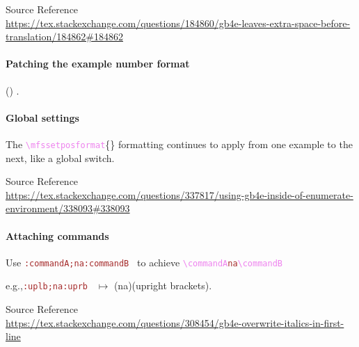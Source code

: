 \documentclass{article}
\newcommand\surl[1]{{\footnotesize\noindent Source Reference}\\\url{#1}}
\newcommand\uplb{\textup{(}}
\newcommand\uprb{\textup{)}}
\newcommand\para[1]{\bigskip\bigskip\paragraph{#1}}
\newcommand\glcmd[1]{\textcolor{violet}{\texttt{\textbackslash#1}}}
\newcommand\glcmdb[1]{\glcmd{#1}\{\}}
\newcommand\glmeta[1]{\textcolor{brown}{\texttt{#1}}}
\newcommand\eg{e.g.,\space}
\begin{document}
\surl{https://tex.stackexchange.com/questions/184860/gb4e-leaves-extra-space-before-translation/184862#184862}


\para{Patching the example number format}

{
\makeatletter
\patchcmd\@exe
  {(\thexnumi)}
  {\thexnumi.}
  {}{}
\makeatother
\begin{exe}
    \ex
\end{exe}
}



\para{Global settings}

The \glcmdb{mfssetposformat} formatting continues to apply from one example to the next, like a global switch.


\begin{exe}
\ex
\end{exe}

\surl{https://tex.stackexchange.com/questions/337817/using-gb4e-inside-of-enumerate-environment/338093#338093}


\para{Attaching commands} Use \glmeta{:commandA;na:commandB } to achieve \glcmd{commandA}\glmeta{na}\glcmd{commandB}

\eg\glmeta{:uplb;na:uprb } $\mapsto$ \uplb na\uprb (upright brackets).


\begin{exe}
\ex
\ex
\end{exe}

\surl{https://tex.stackexchange.com/questions/308454/gb4e-overwrite-italics-in-first-line}


%
\end{document}
